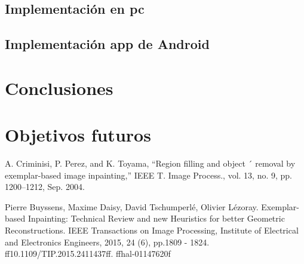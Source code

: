 \documentclass[conference]{IEEEtran}
\begin{document}
\subsection{Implementación en pc}

\subsection{Implementación app de Android}

\section{Conclusiones}

\section{Objetivos futuros}


\begin{thebibliography}{00}
 A. Criminisi, P. Perez, and K. Toyama, “Region filling and object ´
removal by exemplar-based image inpainting,” IEEE T. Image Process.,
vol. 13, no. 9, pp. 1200–1212, Sep. 2004.

 Pierre Buyssens, Maxime Daisy, David Tschumperlé, Olivier Lézoray. Exemplar-based Inpainting:
Technical Review and new Heuristics for better Geometric Reconstructions. IEEE Transactions on
Image Processing, Institute of Electrical and Electronics Engineers, 2015, 24 (6), pp.1809 - 1824.
ff10.1109/TIP.2015.2411437ff. ffhal-01147620f
\end{thebibliography}
\end{document}
